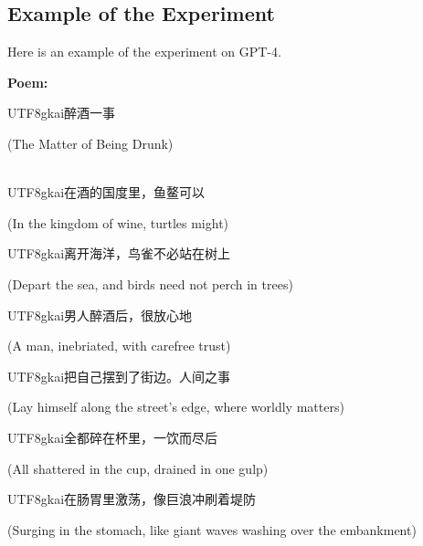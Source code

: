 \documentclass[11pt]{article}
\begin{document}
\subsection{Example of the Experiment}
\label{subsec: Example of the Experiment}

Here is an example of the experiment on GPT-4.



\textbf{Poem:}

\begin{center}
\begin{CJK}{UTF8}{gkai}醉酒一事\end{CJK}

(The Matter of Being Drunk)\\\


\begin{CJK}{UTF8}{gkai}在酒的国度里，鱼鳌可以\end{CJK}

(In the kingdom of wine, turtles might)

\begin{CJK}{UTF8}{gkai}离开海洋，鸟雀不必站在树上\end{CJK}

(Depart the sea, and birds need not perch in trees)

\begin{CJK}{UTF8}{gkai}男人醉酒后，很放心地\end{CJK}

(A man, inebriated, with carefree trust)

\begin{CJK}{UTF8}{gkai}把自己摆到了街边。人间之事\end{CJK}

(Lay himself along the street’s edge, where worldly matters)

\begin{CJK}{UTF8}{gkai}全都碎在杯里，一饮而尽后\end{CJK}

(All shattered in the cup, drained in one gulp)

\begin{CJK}{UTF8}{gkai}在肠胃里激荡，像巨浪冲刷着堤防\end{CJK}

(Surging in the stomach, like giant waves washing over the embankment)\\\





\end{center}
\end{document}
